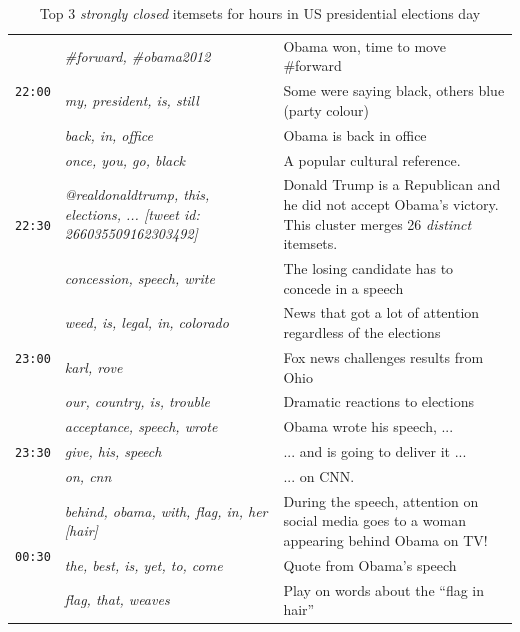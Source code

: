 \documentclass[letterpaper,12pt,titlepage,oneside,final]{book}
\begin{document}
\begin{table}
\begin{center}
\begin{tabular}{|p{1cm}|p{6cm}|p{9cm}|}
\multirow{3}{*}{\texttt{22:00}} 	& \em \#forward, \#obama2012		&  Obama won, time to move \#forward \\ \cline{2-3}
					   	& \em my, president, is, still		& Some were saying black, others blue (party colour) \\ \cline{2-3}
						&\em  back, in, office		&   Obama is back in office\\\hline

\multirow{3}{*}{\texttt{22:30}} 	& \em once, you, go, black		& A popular cultural reference.\\ \cline{2-3} %
					   	& \em @realdonaldtrump, this, elections, ... [tweet id: 266035509162303492] 		& Donald Trump is a Republican and he did not accept Obama's victory. This cluster merges 26 \emph{distinct} itemsets.\\ \cline{2-3}
						& \em concession, speech, write		&   The losing candidate has to concede in a speech 
						\\\hline
						
\multirow{3}{*}{\texttt{23:00}} 	&\em  weed, is, legal, in, colorado		&  News that got a lot of attention regardless of the elections  \\ \cline{2-3}
					   	&\em  karl, rove		& Fox news challenges results from Ohio\\ \cline{2-3}
						& \em our, country, is, trouble		&   Dramatic reactions to elections \\\hline						
\multirow{3}{*}{\texttt{23:30}} 	&\em  acceptance, speech, wrote		&  Obama wrote his speech, ...\\ \cline{2-3}
					   	& \em give, his, speech		& ... and is going to deliver it ... \\ \cline{2-3}
						& \em on, cnn		&   ... on CNN. \\\hline	
						
\multirow{3}{*}{\texttt{00:30}} 	& \em behind, obama, with, flag, in, her [hair]		&  During the speech, attention on social media goes to a woman appearing behind Obama on TV! \\ \cline{2-3}
					   	& \em the, best, is, yet, to, come		&  Quote from Obama's speech\\ \cline{2-3}
						& \em flag, that, weaves	& Play on words about the ``flag in hair'' \\\hline																			
\end{tabular}
\end{center}
\caption{Top 3 \emph{strongly closed} itemsets for hours in US presidential elections day}
 \label{table:nov6}
\end{table}
\end{document}

